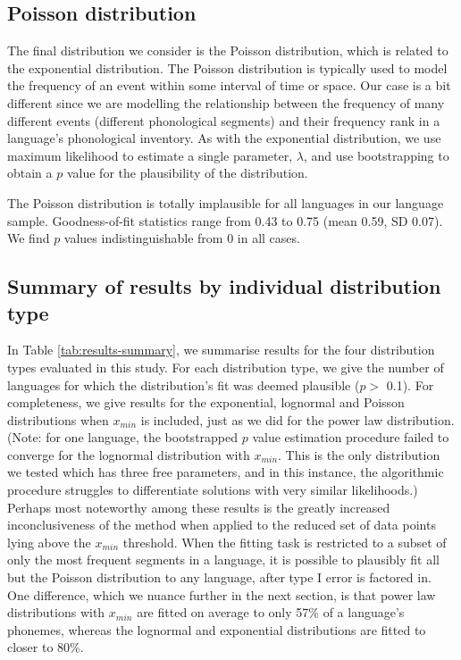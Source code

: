 \hypertarget{poisson-distribution}{%
\subsection{Poisson distribution}\label{poisson-distribution}}

The final distribution we consider is the Poisson distribution, which is related to the exponential distribution. The Poisson distribution is typically used to model the frequency of an event within some interval of time or space. Our case is a bit different since we are modelling the relationship between the frequency of many different events (different phonological segments) and their frequency rank in a language's phonological inventory. As with the exponential distribution, we use maximum likelihood to estimate a single parameter, \(\lambda\), and use bootstrapping to obtain a \(p\) value for the plausibility of the distribution.

The Poisson distribution is totally implausible for all languages in our language sample. Goodness-of-fit statistics range from 0.43 to 0.75 (mean 0.59, SD 0.07). We find \(p\) values indistinguishable from 0 in all cases.

\hypertarget{phon-freq-results-summary}{%
\subsection{Summary of results by individual distribution type}\label{phon-freq-results-summary}}

In Table \ref{tab:results-summary}, we summarise results for the four distribution types evaluated in this study. For each distribution type, we give the number of languages for which the distribution's fit was deemed plausible (\(p >\) 0.1). For completeness, we give results for the exponential, lognormal and Poisson distributions when \(x_{min}\) is included, just as we did for the power law distribution. (Note: for one language, the bootstrapped \(p\) value estimation procedure failed to converge for the lognormal distribution with \(x_{min}\). This is the only distribution we tested which has three free parameters, and in this instance, the algorithmic procedure struggles to differentiate solutions with very similar likelihoods.) Perhaps most noteworthy among these results is the greatly increased inconclusiveness of the method when applied to the reduced set of data points lying above the \(x_{min}\) threshold. When the fitting task is restricted to a subset of only the most frequent segments in a language, it is possible to plausibly fit all but the Poisson distribution to any language, after type I error is factored in. One difference, which we nuance further in the next section, is that power law distributions with \(x_{min}\) are fitted on average to only 57\% of a language's phonemes, whereas the lognormal and exponential distributions are fitted to closer to 80\%.

